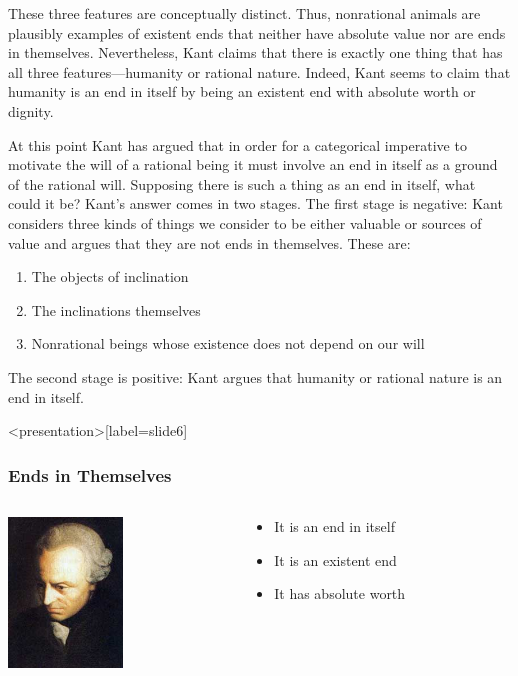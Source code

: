 These three features are conceptually distinct. Thus, nonrational animals are plausibly examples of existent ends that neither have absolute value nor are ends in themselves. Nevertheless, Kant claims that there is exactly one thing that has all three features---humanity or rational nature. Indeed, Kant seems to claim that humanity is an end in itself by being an existent end with absolute worth or dignity.

At this point Kant has argued that in order for a categorical imperative to motivate the will of a rational being it must involve an end in itself as a ground of the rational will. Supposing there is such a thing as an end in itself, what could it be? Kant’s answer comes in two stages. The first stage is negative: Kant considers three kinds of things we consider to be either valuable or sources of value and argues that they are not ends in themselves. These are:
\begin{enumerate}
    \item The objects of inclination
    \item The inclinations themselves
    \item Nonrational beings whose existence does not depend on our will
\end{enumerate}
The second stage is positive: Kant argues that humanity or rational nature is an end in itself. \change

\begin{frame}<presentation>[label=slide6]
    \frametitle{Ends in Themselves}
        \begin{columns}
            \begin{column}{3cm}
                \includegraphics[height=4cm]{../../graphics/kant.jpg}
            \end{column}
            \begin{column}{7cm}
                \begin{itemize}
                \item<2-> It is an \alert{end in itself}
                \item<3-> It is an \alert{existent end}
                \item<4-> It has \alert{absolute worth}
                \end{itemize}
            \end{column}
        \end{columns}
\end{frame}

